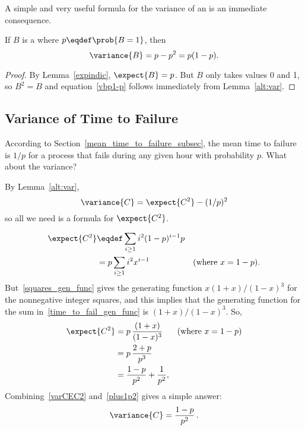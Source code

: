 A simple and very useful formula for the variance of an  is an immediate consequence.
\begin{corollary}\label{bernoulli-variance}
If $B$ is a  where $p\eqdef
\prob{B=1}$, then
\begin{equation}\label{vbp1-p}
\variance{B} = p-p^2 = p(1-p).
\end{equation}
\begin{proof}
  By Lemma~\ref{expindic}, $\expect{B}= p$.  But $B$ only takes
  values 0 and 1, so $B^2 = B$ and equation~\eqref{vbp1-p} follows
  immediately from Lemma~\ref{alt:var}.
\end{proof}

\end{corollary}

\subsection{Variance of Time to Failure}
According to Section~\ref{mean_time_to_failure_subsec}, the mean time
to failure is $1/p$ for a process that fails during any given hour
with probability $p$.  What about the variance?

By Lemma~\ref{alt:var},
\begin{equation}\label{varCEC2}
\variance{C} = \expect{C^2} - (1/p)^2
\end{equation}
so all we need is a formula for $\expect{C^2}$.

\iffalse

\begin{align}
\expect{C^2}
   & \eqdef \sum_{i\geq 1} i^2(1-p)^{i-1}p \notag\\ %
   & = p\sum_{i\geq 1} i^2x^{i-1} & \text{(where $x=1-p$)}\label{time_to_fail_gen_func}.
\end{align}
But~\eqref{squares_gen_func} gives the generating function
$x(1+x)/(1-x)^3$ for the nonnegative integer squares, and this implies that
the generating function for the sum in~\eqref{time_to_fail_gen_func} is
$(1+x)/(1-x)^3$.  So,
\begin{align}
\expect{C^2} & = p\, \frac{(1+x)}{(1-x)^3} & \text{(where $x=1-p$)}\notag\\
             & = p\, \frac{2+p}{p^3}\notag\\
             & = \frac{1-p}{p^2} + \frac{1}{p^2}\label{plus1p2},
\end{align}
Combining~\eqref{varCEC2} and~\eqref{plus1p2} gives a simple answer:
\begin{equation}\label{var_time_to_fail}
\variance{C} = \frac{1-p}{p^2} \,.
\end{equation}

